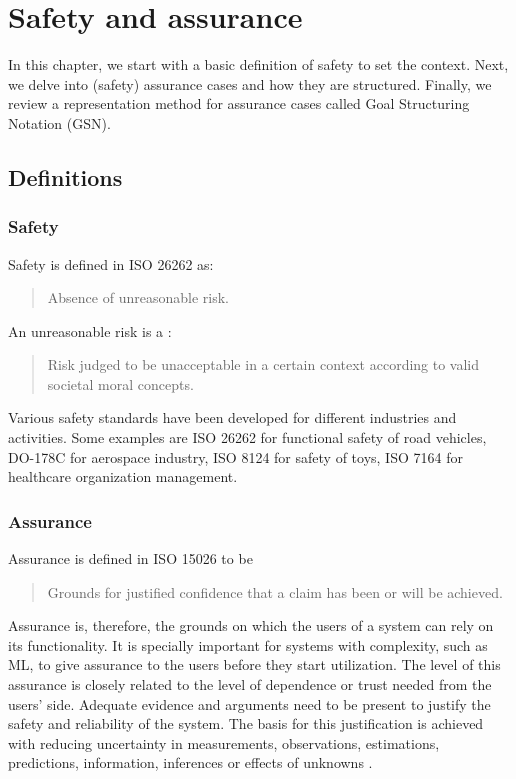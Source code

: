 \chapter{Safety and assurance}
\label{chap:safety}

In this chapter, we start with a basic definition of safety to set the context. Next, we delve into (safety) assurance cases and how they are structured. Finally, we review a representation method for assurance cases called Goal Structuring Notation (GSN).

\section{Definitions}
\subsection{Safety}

Safety is defined in ISO 26262 \cite{organization2018iso} as:
\begin{quotation}
Absence of unreasonable risk.
\end{quotation}  
An unreasonable risk is a \cite{organization2018iso}:
\begin{quotation}
Risk judged to be unacceptable in a certain context according to valid societal moral concepts.
\end{quotation}
Various safety standards have been developed for different industries and activities. Some examples are ISO 26262 for functional safety of road vehicles, DO-178C for aerospace industry, ISO 8124 for safety of toys, ISO 7164 for healthcare organization management.

\subsection{Assurance}
Assurance is defined in ISO 15026 to be \cite{iso15026-1-2019}
\begin{quotation}
Grounds for justified confidence that a claim has been or will be achieved.
\end{quotation}
Assurance is, therefore, the grounds on which the users of a system can rely on its functionality. It is specially important for systems with complexity, such as ML, to give assurance to the users before they start utilization. The level of this assurance is closely related to the level of dependence or trust needed from the users' side. Adequate evidence and arguments need to be present to justify the safety and reliability of the system. The basis for this justification is achieved with reducing uncertainty in measurements, observations, estimations, predictions, information, inferences or effects of unknowns \cite{iso15026-1-2019}. 

